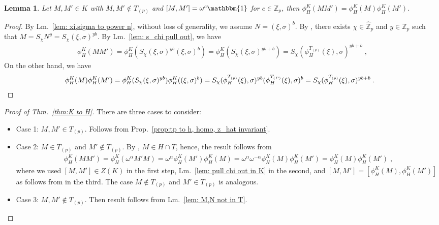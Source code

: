 \documentclass[aps,pra,letterpaper,onrcolumn,nofootinbib,notitlepage,longbibliography]{revtex4-1}
\newtheorem{lemma}{Lemma}
\newcommand{\one}{\mathbbm{1}}
\newcommand{\Z}{\mathbb Z}
\begin{document}
\begin{lemma}{\label{lem: M,N not in T}}
    Let $M,M'\in K$ with $M,M'\not\in T_{(p)}$ and $[M,M']=\omega^c\one$ for $c\in\Z_p$, then $\phi^K_H(MM')=\phi^K_H(M)\phi^K_H(M')$.
\end{lemma}

\begin{proof}
    By Lm.~\ref{lem: xi,sigma to power n}, without loss of generality, we assume $N=(\xi,\sigma)^b$. By \cite[Lm.~4 (3)]{FrembsChungOkay2022}, there exists $\chi\in\hat{\Z}_p$ and $y\in \Z_p$ such that $M=S_\chi N^y=S_\chi(\xi,\sigma)^{yb}$. By Lm.~\ref{lem: s_chi pull out}, we have
    \begin{align*}
        \phi^K_H(MM')
        =\phi^K_H(S_\chi(\xi,\sigma)^{yb}(\xi,\sigma)^b)
        =\phi^K_H(S_\chi(\xi,\sigma)^{yb+b})
        =S_\chi(\phi^{T_{(p)}}_H(\xi),\sigma)^{yb+b}\; ,
    \end{align*}
    On the other hand, we have
    \begin{align*}
        \hspace{.75cm}
        \phi^K_H(M)\phi^K_H(M')
        =\phi^K_H(S_\chi(\xi,\sigma)^{yb})\phi^K_H((\xi,\sigma)^b)
        =S_\chi(\phi^{T_{(p)}}_H(\xi),\sigma)^{yb}(\phi^{T_{(P)}}_H(\xi),\sigma)^b
        =S_\chi(\phi^{T_{(p)}}_H(\xi),\sigma)^{yb+b}\; .
        \hspace{1cm}\qedhere
    \end{align*}
\end{proof}

\vspace{.2cm}

\begin{proof}[Proof of Thm.~\ref{thm:K to H}]
    There are three cases to consider:
    \begin{itemize}
        \item Case 1: $M,M'\in T_{(p)}$. Follows from Prop.~\ref{prop:tp to h, homo, z_hat invariant}.
        \item Case 2: $M\in T_{(p)}$ and $M'\not\in T_{(p)}$. By \cite[Lm.~4]{FrembsChungOkay2022}, $M\in H\cap T$, hence, the result follows from
        \begin{align*}
            \phi^K_H(MM')
            =\phi^K_H(\omega^\alpha M'M)
            =\omega^\alpha \phi^K_H(M')\phi^K_H(M)
            =\omega^\alpha\omega^{-\alpha}\phi^K_H(M)\phi^K_H(M')
            =\phi^K_H(M)\phi^K_H(M')\; ,
        \end{align*}
        where we used $[M,M']\in Z(K)$ in the first step, Lm.~\ref{lem: pull chi out in K} in the second, and $[M,M']=[\phi^K_H(M),\phi^K_H(M')]$ as follows from \cite[Cor.~3]{FrembsChungOkay2022} in the third. The case $M\not\in T_{(p)}$ and $M'\in T_{(p)}$ is analogous.
        \item Case 3: $M,M'\notin T_{(p)}$. Then result follows from Lm.~\ref{lem: M,N not in T}.\hfill\qedhere
    \end{itemize}
\end{proof}
\end{document}
